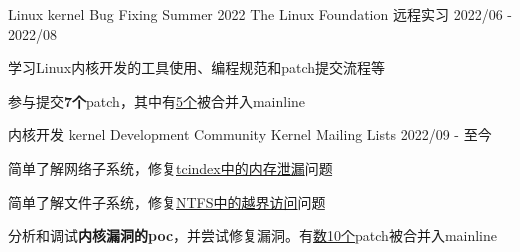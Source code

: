 

\begin{cventries}

  \cventry
    {Linux kernel Bug Fixing Summer 2022} %
    {The Linux Foundation} %
    {远程实习} %
    {2022/06 - 2022/08} %
    {
      \begin{cvitems} %
        \item {学习Linux内核开发的工具使用、编程规范和patch提交流程等}
        \item {参与提交\textbf{7个}patch，其中有\href{https://git.kernel.org/pub/scm/linux/kernel/git/torvalds/linux.git/log/?qt=grep&q=hawkins+jiawei}{\textcolor{awesome-skyblue}{5个}}被合并入mainline}
      \end{cvitems}
    }

  \cventry
    {内核开发} %
    {kernel Development Community} %
    {Kernel Mailing Lists} %
    {2022/09 - 至今} %
    {
      \begin{cvitems} %
        \item {简单了解网络子系统，修复\href{https://git.kernel.org/pub/scm/linux/kernel/git/torvalds/linux.git/commit/?id=399ab7fe0fa0d846881685fd4e57e9a8ef7559f7}{\textcolor{awesome-skyblue}{tcindex中的内存泄漏}}问题}
        \item {简单了解文件子系统，修复\href{https://git.kernel.org/pub/scm/linux/kernel/git/torvalds/linux.git/commit/?id=d85a1bec8e8d552ab13163ca1874dcd82f3d1550}{\textcolor{awesome-skyblue}{NTFS中的越界访问}}问题}
        \item {分析和调试\textbf{内核漏洞的poc}，并尝试修复漏洞。有\href{https://git.kernel.org/pub/scm/linux/kernel/git/torvalds/linux.git/log/?qt=author&q=hawkins+jiawei}{\textcolor{awesome-skyblue}{数10个}}patch被合并入mainline}
      \end{cvitems}
    }


\end{cventries}
